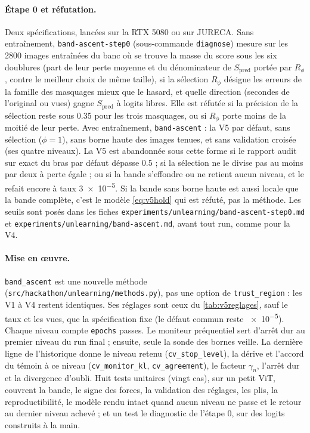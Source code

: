 \documentclass[11pt,a4paper]{article}
\newcommand{\code}[1]{\texttt{#1}}
\newcommand{\chemin}[1]{\nolinkurl{#1}}%
\begin{document}
\paragraph{Étape 0 et réfutation.} Deux spécifications, lancées sur la RTX 5080 ou sur JURECA.
Sans entraînement, \code{band-ascent-step0} (sous-commande \code{diagnose}) mesure sur les 2800 images
entraînées du banc où se trouve la masse du score sous les six doublures (part de leur perte moyenne et
du dénominateur de $S_{\text{pred}}$ portée par $R_\phi$, contre le meilleur choix de même taille), si
la sélection $R_\phi$ désigne les erreurs de la famille des masquages mieux que le hasard, et quelle
direction (secondes de l'original ou vues) gagne $S_{\text{pred}}$ à logits libres. Elle est réfutée si
la précision de la sélection reste sous \num{0.35} pour les trois masquages, ou si $R_\phi$ porte moins
de la moitié de leur perte. Avec entraînement, \code{band-ascent} : la V5 par défaut, sans sélection
($\phi=1$), sans borne haute des images tenues, et sans validation croisée (ses quatre niveaux). La V5
est abandonnée sous cette forme si le rapport audit sur exact du bras par défaut dépasse \num{0.5} ; si
la sélection ne le divise pas au moins par deux à perte égale ; ou si la bande s'effondre ou ne retient
aucun niveau, et le refait encore à taux \num{3e-5}. Si la bande sans borne haute est aussi locale que
la bande complète, c'est le modèle \eqref{eq:v5hold} qui est réfuté, pas la méthode. Les seuils sont
posés dans les fiches \chemin{experiments/unlearning/band-ascent-step0.md} et
\chemin{experiments/unlearning/band-ascent.md}, avant tout run, comme pour la V4.

\paragraph{Mise en œuvre.} \code{band\_ascent} est une nouvelle méthode
(\chemin{src/hackathon/unlearning/methods.py}), pas une option de \code{trust\_region} : les V1 à V4
restent identiques. Ses réglages sont ceux du \cref{tab:v5reglages}, sauf le taux et les vues, que la
spécification fixe (le défaut commun reste \num{e-5}). Chaque niveau compte \code{epochs} passes. Le
moniteur préquentiel sert d'arrêt dur au premier niveau du run final ; ensuite, seule la sonde des
bornes veille. La dernière ligne de l'historique donne le niveau retenu (\code{cv\_stop\_level}), la
dérive et l'accord du témoin à ce niveau (\code{cv\_monitor\_kl}, \code{cv\_agreement}), le facteur
$\gamma_n$, l'arrêt dur et la divergence d'oubli. Huit tests unitaires (vingt cas), sur un petit ViT,
couvrent la
bande, le signe des forces, la validation des réglages, les plis, la reproductibilité, le modèle rendu
intact quand aucun niveau ne passe et le retour au dernier niveau achevé ; et un test le diagnostic de
l'étape 0, sur des logits construits à la main.
\end{document}
